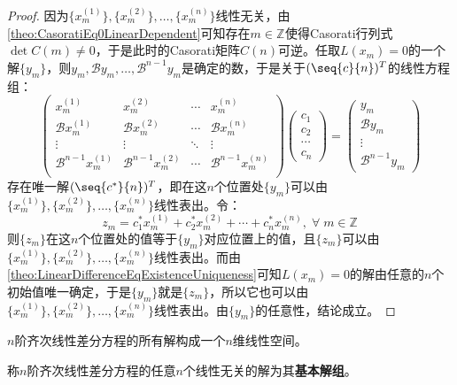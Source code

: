 \begin{proof}
	因为$\{x_m^{(1)}\},\{x_m^{(2)}\},\dots,\{x_m^{(n)}\}$线性无关，由\cref{theo:CasoratiEq0LinearDependent}可知存在$m\in\mathbb{Z}^{}$使得Casorati行列式$\det C(m)\ne0$，于是此时的Casorati矩阵$C(n)$可逆。任取$L(x_m)=0$的一个解$\{y_m\}$，则$y_m,\mathcal{B}y_m,\dots,\mathcal{B}^{n-1}y_m$是确定的数，于是关于$(\seq{c}{n})^T$的线性方程组：
	\begin{equation*}
		\begin{pmatrix}
			x_m^{(1)} & x_m^{(2)} & \cdots & x_m^{(n)} \\
			\mathcal{B}x_m^{(1)} & \mathcal{B}x_m^{(2)} & \cdots & \mathcal{B}x_m^{(n)} \\
			\vdots & \vdots & \ddots & \vdots \\
			\mathcal{B}^{n-1}x_m^{(1)} & \mathcal{B}^{n-1}x_m^{(2)} & \cdots & \mathcal{B}^{n-1}x_m^{(n)} \\
		\end{pmatrix}
		\begin{pmatrix}
			c_1 \\
			c_2 \\
			\cdots \\
			c_n
		\end{pmatrix}=
		\begin{pmatrix}
			y_m \\
			\mathcal{B}y_m \\
			\vdots \\
			\mathcal{B}^{n-1}y_m
		\end{pmatrix}
	\end{equation*}
	存在唯一解$(\seq{c^*}{n})^T$，即在这$n$个位置处$\{y_m\}$可以由$\{x_m^{(1)}\},\{x_m^{(2)}\},\dots,\{x_m^{(n)}\}$线性表出。令：
	\begin{equation*}
		z_m=c_1^*x_m^{(1)}+c_2^*x_m^{(2)}+\cdots+c_n^*x_m^{(n)},\;\forall\;m\in\mathbb{Z}^{}
	\end{equation*}
	则$\{z_m\}$在这$n$个位置处的值等于$\{y_m\}$对应位置上的值，且$\{z_m\}$可以由$\{x_m^{(1)}\},\{x_m^{(2)}\},\dots,\{x_m^{(n)}\}$线性表出。而由\cref{theo:LinearDifferenceEqExistenceUniqueness}可知$L(x_m)=0$的解由任意的$n$个初始值唯一确定，于是$\{y_m\}$就是$\{z_m\}$，所以它也可以由$\{x_m^{(1)}\},\{x_m^{(2)}\},\dots,\{x_m^{(n)}\}$线性表出。由$\{y_m\}$的任意性，结论成立。
\end{proof}
\begin{corollary}\label{cor:LinearSpaceSolutionHomogeneousLinearDifferenceEquation}
	$n$阶齐次线性差分方程的所有解构成一个$n$维线性空间。
\end{corollary}
\begin{definition}
	称$n$阶齐次线性差分方程的任意$n$个线性无关的解为其\textbf{基本解组}。
\end{definition}
